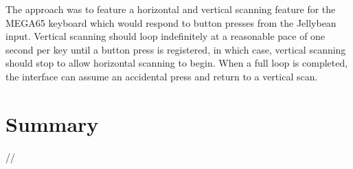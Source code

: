 The approach was to feature a horizontal and vertical scanning feature for the MEGA65 keyboard which would respond to button presses from the Jellybean input.
Vertical scanning should loop indefinitely at a reasonable pace of one second per key until a button press is registered, in which case, vertical scanning should stop to allow horizontal scanning to begin.
When a full loop is completed, the interface can assume an accidental press and return to a vertical scan. %




\section{Summary}  %
//